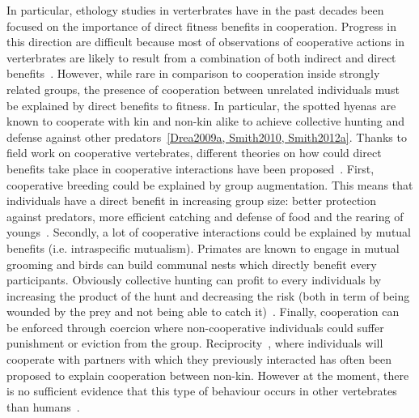     In particular, ethology studies in verterbrates have in the past decades been focused on the importance of direct fitness benefits in cooperation. Progress in this direction are difficult because most of observations of cooperative actions in verterbrates are likely to result from a combination of both indirect and direct benefits~\parencite{Clutton-Brock2009}. However, while rare in comparison to cooperation inside strongly related groups, the presence of cooperation between unrelated individuals must be explained by direct benefits to fitness. In particular, the spotted hyenas are known to cooperate with kin and non-kin alike to achieve collective hunting and defense against other predators~\ref{Drea2009a, Smith2010, Smith2012a}. Thanks to field work on cooperative vertebrates, different theories on how could direct benefits take place in cooperative interactions have been proposed~\parencite{Clutton-Brock2002}. First, cooperative breeding could be explained by group augmentation. This means that individuals have a direct benefit in increasing group size: better protection against predators, more efficient catching and defense of food and the rearing of youngs~\parencite{Packer2001}. Secondly, a lot of cooperative interactions could be explained by mutual benefits (i.e. intraspecific mutualism). Primates are known to engage in mutual grooming and birds can build communal nests which directly benefit every participants. Obviously collective hunting can profit to every individuals by increasing the product of the hunt and decreasing the risk (both in term of being wounded by the prey and not being able to catch it)~\parencite{Scheel1991}. Finally, cooperation can be enforced through coercion where non-cooperative individuals could suffer punishment or eviction from the group. Reciprocity~\parencite{Trivers1971}, where individuals will cooperate with partners with which they previously interacted has often been proposed to explain cooperation between non-kin. However at the moment, there is no sufficient evidence that this type of behaviour occurs in other vertebrates than humans~\parencite{Hammerstein2003, Clutton-Brock2009, Andre2014}.


